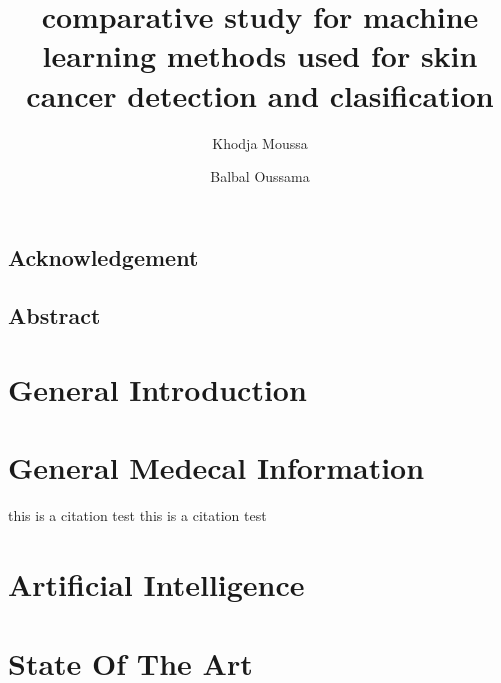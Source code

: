 \documentclass[12pt,a4paper]{report}
\title{comparative study for machine learning methods used for skin cancer detection and clasification}
\author{
	Khodja Moussa
	\and
	Balbal Oussama
}
\date{}
\begin{document}


\section*{Acknowledgement}
\newpage
\section*{Abstract}
\newpage
\tableofcontents
\listoffigures
\listoftables
\newpage

\chapter{General Introduction}

\chapter{General Medecal Information}


this is a citation test \cite{elin2018}
this is a citation test \cite{eliana2022} \cite{mahsa2022}

\chapter{Artificial Intelligence}

\chapter{State Of The Art}





\end{document}
